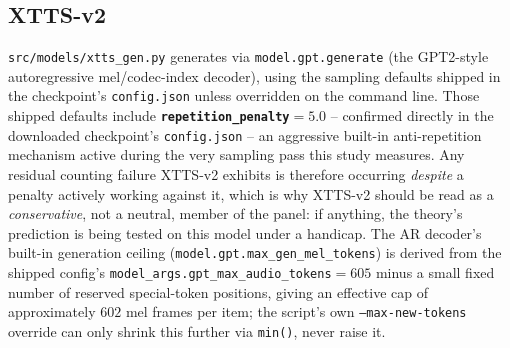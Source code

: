 \documentclass[11pt]{article}
\begin{document}
\subsection{XTTS-v2}

\texttt{src/models/xtts\_gen.py} generates via \texttt{model.gpt.generate}
(the GPT2-style autoregressive mel/codec-index decoder), using the sampling
defaults shipped in the checkpoint's \texttt{config.json} unless overridden
on the command line. Those shipped defaults include
\textbf{\texttt{repetition\_penalty}$=5.0$} -- confirmed directly in the
downloaded checkpoint's \texttt{config.json} -- an aggressive built-in
anti-repetition mechanism active during the very sampling pass this study
measures. Any residual counting failure XTTS-v2 exhibits is therefore
occurring \emph{despite} a penalty actively working against it, which is why
XTTS-v2 should be read as a
\emph{conservative}, not a neutral, member of the panel: if anything, the
theory's prediction is being tested on this model under a handicap. The AR
decoder's built-in generation ceiling
(\texttt{model.gpt.max\_gen\_mel\_tokens}) is derived from the shipped
config's \texttt{model\_args.gpt\_max\_audio\_tokens}$=605$ minus a small
fixed number of reserved special-token positions, giving an effective cap of
approximately $602$ mel frames per item; the script's own
\texttt{--max-new-tokens} override can only shrink this further via
\texttt{min()}, never raise it.
\end{document}
